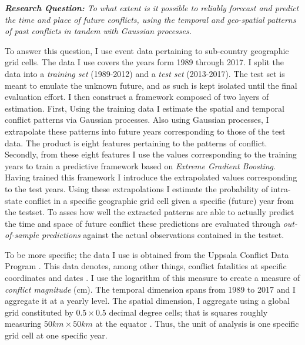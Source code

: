 \documentclass[a4paper]{article}
\begin{document}





\begin{displayquote}

\emph{\textbf{Research Question:} To what extent is it possible to reliably forecast and predict the time and place of future conflicts, using the temporal and geo-spatial patterns of past conflicts in tandem with Gaussian processes.}\par

\end{displayquote}

To answer this question, I use event data pertaining to sub-country geographic grid cells. The data I use covers the years form 1989 through 2017. I split the data into a \emph{training set} (1989-2012) and a \emph{test set} (2013-2017). The test set is meant to emulate the unknown future, and as such is kept isolated until the final evaluation effort. I then construct a framework composed of two layers of estimation. First, Using the training data I estimate the spatial and temporal conflict patterns via Gaussian processes. Also using Gaussian processes, I extrapolate these patterns into future years corresponding to those of the test data. The product is eight features pertaining to the patterns of conflict. Secondly, from these eight features I use the values corresponding to the training years to train a predictive framework based on \emph{Extreme Gradient Boosting}. Having trained this framework I introduce the extrapolated values corresponding to the test years. Using these extrapolations I estimate the probability of intra-state conflict in a specific geographic grid cell given a specific (future) year from the testset. To asses how well the extracted patterns are able to actually predict the time and space of future conflict these predictions are evaluated through \emph{out-of-sample predictions} against the actual observations contained in the testset.\par

To be more specific; the data I use is obtained from the Uppsala Conflict Data Program \citep{UCDP_2017}. This data denotes, among other things, conflict fatalities at specific coordinates and dates \citep{UCDP_2017}. I use the logarithm of this measure to create a measure of \emph{conflict magnitude} (cm). The temporal dimension spans from 1989 to 2017 and I aggregate it at a yearly level. The spatial dimension, I aggregate using a global grid constituted by $0.5 \times 0.5$ decimal degree cells; that is squares roughly measuring $50km\times50km$ at the equator \citep[367]{Tollefsen_2012}. Thus, the unit of analysis is one specific grid cell at one specific year.\par
\end{document}
